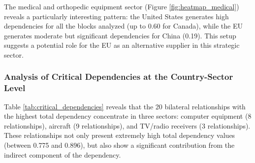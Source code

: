 \documentclass[final,1p,times,authoryear]{elsarticle}
\begin{document}
The medical and orthopedic equipment sector (Figure \ref{fig:heatmap_medical}) reveals a particularly interesting pattern: the United States generates high dependencies for all the blocks analyzed (up to 0.60 for Canada), while the EU generates moderate but significant dependencies for China (0.19). This setup suggests a potential role for the EU as an alternative supplier in this strategic sector.

\subsubsection{Analysis of Critical Dependencies at the Country-Sector Level}

Table \ref{tab:critical_dependencies} reveals that the 20 bilateral relationships with the highest total dependency concentrate in three sectors: computer equipment (8 relationships), aircraft (9 relationships), and TV/radio receivers (3 relationships). These relationships not only present extremely high total dependency values (between 0.775 and 0.896), but also show a significant contribution from the indirect component of the dependency.
\end{document}
